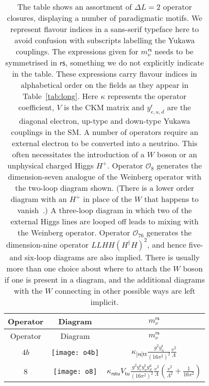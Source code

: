 \begin{longtable}[t]{ccc}
  \caption{The table shows an assortment of $\Delta L = 2$ operator closures, displaying a number of paradigmatic motifs. We represent flavour indices in a sans-serif typeface here to avoid confusion with subscripts labelling the Yukawa couplings. The expressions given for $m_{\nu}^{\textsf{rs}}$ needs to be symmetrised in $\textsf{rs}$, something we do not explicitly indicate in the table. These expressions carry flavour indices in alphabetical order on the fields as they appear in Table~\ref{tab:long}. Here $\kappa$ represents the operator coefficient, $V$ is the CKM matrix and $y^{\textsf{r}}_{e,u,d}$ are the diagonal electron, up-type and down-type Yukawa couplings in the SM. A number of operators require an external electron to be converted into a neutrino. This often necessitates the introduction of a $W$ boson or an unphysical charged Higgs $H^{+}$. Operator $\mathcal{O}_{8}$ generates the dimension-seven analogue of the Weinberg operator with the two-loop diagram shown. (There is a lower order diagram with an $H^{+}$ in place of the $W$ that happens to vanish~\cite{Babu:2010vp}.) A three-loop diagram in which two of the external Higgs lines are looped off leads to mixing with the Weinberg operator. Operator $\mathcal{O}_{76}$ generates the dimension-nine operator $LLHH(H^{\dagger}H)^{2}$, and hence five- and six-loop diagrams are also implied. There is usually more than one choice about where to attach the $W$ boson if one is present in a diagram, and the additional diagrams with the $W$ connecting in other possible ways are left implicit.\label{tab:example-closures}}\\
  \toprule
  Operator & Diagram & $m_{\nu}^{\textsf{rs}}$ \\
  \midrule
  \endfirsthead
  \toprule
  Operator & Diagram & $m_{\nu}^{\textsf{rs}}$ \\
  \midrule
  \endhead
  $4b$ &
\begin{minipage}{0.2\linewidth}
  \centering
  \texttt{[image: o4b]}
\end{minipage}
  & $\displaystyle \kappa_{\textsf{[rs]tt}} \frac{g^{2} y_u^{\textsf{t}}}{(16\pi^{2})^{2}} \frac{v^{2}}{\Lambda}$  \\
    $8$ &
    \begin{minipage}{0.2\linewidth}
        \centering
        \texttt{[image: o8]}
      \end{minipage} & $\displaystyle \kappa_{\textsf{rstu}} V_{\textsf{tu}} \frac{g^{2} y_{e}^{\textsf{s}} y_{u}^{\textsf{t}} y_{d}^{\textsf{u}}}{(16\pi^{2})^{2}} \frac{v^{2}}{\Lambda} \left( \frac{v^{2}}{\Lambda^{2}} + \frac{1}{16 \pi^{2}}\right)$ \\

\end{longtable}
